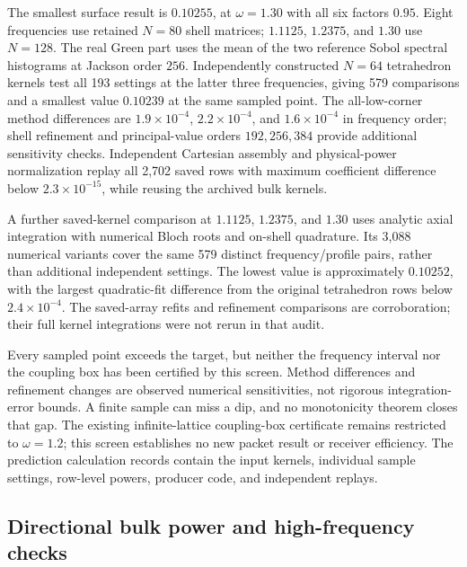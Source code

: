 \documentclass[10pt,aps,onecolumn,notitlepage,nofootinbib]{revtex4-2}
\begin{document}
The smallest surface result is $0.10255$, at $\omega=1.30$ with all six factors $0.95$. Eight frequencies use retained $N=80$ shell matrices; $1.1125$, $1.2375$, and $1.30$ use $N=128$. The real Green part uses the mean of the two reference Sobol spectral histograms at Jackson order $256$. Independently constructed $N=64$ tetrahedron kernels test all 193 settings at the latter three frequencies, giving 579 comparisons and a smallest value $0.10239$ at the same sampled point. The all-low-corner method differences are $1.9\times10^{-4}$, $2.2\times10^{-4}$, and $1.6\times10^{-4}$ in frequency order; shell refinement and principal-value orders $192,256,384$ provide additional sensitivity checks. Independent Cartesian assembly and physical-power normalization replay all 2,702 saved rows with maximum coefficient difference below $2.3\times10^{-15}$, while reusing the archived bulk kernels.

A further saved-kernel comparison at $1.1125$, $1.2375$, and $1.30$ uses analytic axial integration with numerical Bloch roots and on-shell quadrature. Its 3,088 numerical variants cover the same 579 distinct frequency/profile pairs, rather than additional independent settings. The lowest value is approximately $0.10252$, with the largest quadratic-fit difference from the original tetrahedron rows below $2.4\times10^{-4}$. The saved-array refits and refinement comparisons are corroboration; their full kernel integrations were not rerun in that audit.

Every sampled point exceeds the target, but neither the frequency interval nor the coupling box has been certified by this screen. Method differences and refinement changes are observed numerical sensitivities, not rigorous integration-error bounds. A finite sample can miss a dip, and no monotonicity theorem closes that gap. The existing infinite-lattice coupling-box certificate remains restricted to $\omega=1.2$; this screen establishes no new packet result or receiver efficiency. The prediction calculation records contain the input kernels, individual sample settings, row-level powers, producer code, and independent replays.

\subsection{Directional bulk power and high-frequency checks}
\label{sec:sm-pred-backward}
\end{document}
